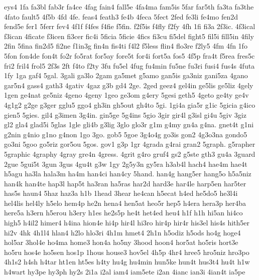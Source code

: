 {eys4 
1fa 
fa3bl 
fab3r 
fa4ce 
4fag 
fain4 
fall5e 
4fa4ma 
fam5is 
5far 
far5th 
fa3ta 
fa3the 
4fato 
fault5 
4f5b 
4fd 
4fe. 
feas4 
feath3 
fe4b 
4feca 
5fect 
2fed 
fe3li 
fe4mo 
fen2d 
fend5e 
fer1 
5ferr 
fev4 
4f1f 
f4fes 
f4fie 
f5fin. 
f2f5is 
f4fly 
f2fy 
4fh 
1fi 
fi3a 
2f3ic. 
4f3ical 
f3ican 
4ficate 
f3icen 
fi3cer 
fic4i 
5ficia 
5ficie 
4fics 
fi3cu 
fi5del 
fight5 
fil5i 
fill5in 
4fily 
2fin 
5fina 
fin2d5 
fi2ne 
f1in3g 
fin4n 
fis4ti 
f4l2 
f5less 
flin4 
flo3re 
f2ly5 
4fm 
4fn 
1fo 
5fon 
fon4de 
fon4t 
fo2r 
fo5rat 
for5ay 
fore5t 
for4i 
fort5a 
fos5 
4f5p 
fra4t 
f5rea 
fres5c 
fri2 
fril4 
frol5 
2f3s 
2ft 
f4to 
f2ty 
3fu 
fu5el 
4fug 
fu4min 
fu5ne 
fu3ri 
fusi4 
fus4s 
4futa 
1fy 
1ga 
gaf4 
5gal. 
3gali 
ga3lo 
2gam 
ga5met 
g5amo 
gan5is 
ga3niz 
gani5za 
4gano 
gar5n4 
gass4 
gath3 
4gativ 
4gaz 
g3b 
gd4 
2ge. 
2ged 
geez4 
gel4in 
ge5lis 
ge5liz 
4gely 
1gen 
ge4nat 
ge5niz 
4geno 
4geny 
1geo 
ge3om 
g4ery 
5gesi 
geth5 
4geto 
ge4ty 
ge4v 
4g1g2 
g2ge 
g3ger 
gglu5 
ggo4 
gh3in 
gh5out 
gh4to 
5gi. 
1gi4a 
gia5r 
g1ic 
5gicia 
g4ico 
gien5 
5gies. 
gil4 
g3imen 
3g4in. 
gin5ge 
5g4ins 
5gio 
3gir 
gir4l 
g3isl 
gi4u 
5giv 
3giz 
gl2 
gla4 
glad5i 
5glas 
1gle 
gli4b 
g3lig 
3glo 
glo3r 
g1m 
g4my 
gn4a 
g4na. 
gnet4t 
g1ni 
g2nin 
g4nio 
g1no 
g4non 
1go 
3go. 
gob5 
5goe 
3g4o4g 
go3is 
gon2 
4g3o3na 
gondo5 
go3ni 
5goo 
go5riz 
gor5ou 
5gos. 
gov1 
g3p 
1gr 
4grada 
g4rai 
gran2 
5graph. 
g5rapher 
5graphic 
4graphy 
4gray 
gre4n 
4gress. 
4grit 
g4ro 
gruf4 
gs2 
g5ste 
gth3 
gu4a 
3guard 
2gue 
5gui5t 
3gun 
3gus 
4gu4t 
g3w 
1gy 
2g5y3n 
gy5ra 
h3ab4l 
hach4 
hae4m 
hae4t 
h5agu 
ha3la 
hala3m 
ha4m 
han4ci 
han4cy 
5hand. 
han4g 
hang5er 
hang5o 
h5a5niz 
han4k 
han4te 
hap3l 
hap5t 
ha3ran 
ha5ras 
har2d 
hard3e 
har4le 
harp5en 
har5ter 
has5s 
haun4 
5haz 
haz3a 
h1b 
1head 
3hear 
he4can 
h5ecat 
h4ed 
he5do5 
he3l4i 
hel4lis 
hel4ly 
h5elo 
hem4p 
he2n 
hena4 
hen5at 
heo5r 
hep5 
h4era 
hera3p 
her4ba 
here5a 
h3ern 
h5erou 
h3ery 
h1es 
he2s5p 
he4t 
het4ed 
heu4 
h1f 
h1h 
hi5an 
hi4co 
high5 
h4il2 
himer4 
h4ina 
hion4e 
hi4p 
hir4l 
hi3ro 
hir4p 
hir4r 
his3el 
his4s 
hith5er 
hi2v 
4hk 
4h1l4 
hlan4 
h2lo 
hlo3ri 
4h1m 
hmet4 
2h1n 
h5odiz 
h5ods 
ho4g 
hoge4 
hol5ar 
3hol4e 
ho4ma 
home3 
hon4a 
ho5ny 
3hood 
hoon4 
hor5at 
ho5ris 
hort3e 
ho5ru 
hos4e 
ho5sen 
hos1p 
1hous 
house3 
hov5el 
4h5p 
4hr4 
hree5 
hro5niz 
hro3po 
4h1s2 
h4sh 
h4tar 
ht1en 
ht5es 
h4ty 
hu4g 
hu4min 
hun5ke 
hun4t 
hus3t4 
hu4t 
h1w 
h4wart 
hy3pe 
hy3ph 
hy2s 
2i1a 
i2al 
iam4 
iam5ete 
i2an 
4ianc 
ian3i 
4ian4t 
ia5pe 
}
